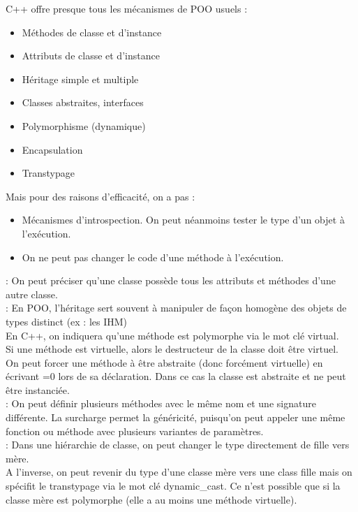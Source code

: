 C++ offre presque tous les mécanismes de POO usuels :
\begin{itemize}
	\item Méthodes de classe et d'instance
	\item Attributs de classe et d'instance
	\item Héritage simple et multiple
	\item Classes abstraites, interfaces
	\item Polymorphisme (dynamique)
	\item Encapsulation
	\item Transtypage
\end{itemize}
Mais pour des raisons d'efficacité, on a pas :
\begin{itemize}
	\item Mécanismes d'introspection. On peut néanmoins tester le type d'un objet à l'exécution.
	\item On ne peut pas changer le code d'une méthode à l'exécution.
\end{itemize}

 : On peut préciser qu'une classe possède tous les attributs et méthodes d'une autre classe. \\

 : En POO, l'héritage sert souvent à manipuler de façon homogène des objets de types distinct (ex : les IHM) \\
En C++, on indiquera qu'une méthode est polymorphe via le mot clé virtual. \\
Si une méthode est virtuelle, alors le destructeur de la classe doit être virtuel. \\
On peut forcer une méthode à être abstraite (donc forcément virtuelle) en écrivant =0 lors de sa déclaration. Dans ce cas la classe est abstraite et ne peut être instanciée. \\

 : On peut définir plusieurs méthodes avec le même nom et une signature différente. La surcharge permet la généricité, puisqu'on peut appeler une même fonction ou méthode avec plusieurs variantes de paramètres. \\

 : Dans une hiérarchie de classe, on peut changer le type directement de fille vers mère. \\
A l'inverse, on peut revenir du type d'une classe mère vers une class fille mais on spécifit le transtypage via le mot clé dynamic_cast. Ce n'est possible que si la classe mère est polymorphe (elle a au moins une méthode virtuelle). 
